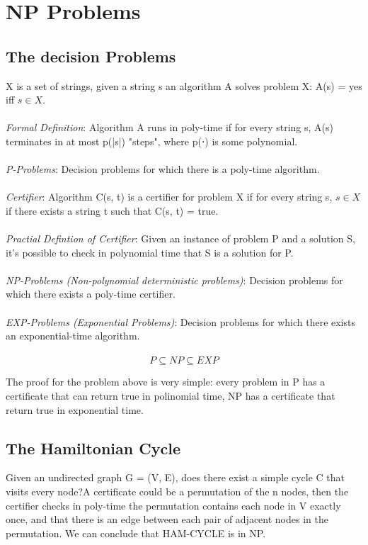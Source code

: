 \section{NP Problems}

\subsection{The decision Problems}
X is a set of strings, given a string s an algorithm A solves problem X: A(s) = yes iff $s \in X$.\\\\
\emph{Formal Definition}: Algorithm A runs in poly-time if for every string s, A(s) terminates in at most p(|s|) "steps", where p(⋅) is some polynomial.\\\\
\emph{P-Problems}:  Decision problems for which there is a poly-time algorithm.\\\\
\emph{Certifier}: Algorithm C(s, t) is a certifier for problem X if for every string s, $s \in X$ if there exists a string t such that C(s, t) = true.\\\\
\emph{Practial Defintion of Certifier}: Given an instance of problem P and a solution S, it's possible to check in polynomial time that S is a solution for P.\\\\
\emph{NP-Problems (Non-polynomial deterministic problems)}: Decision problems for which there exists a poly-time certifier.\\\\
\emph{EXP-Problems (Exponential Problems)}: Decision problems for which there exists an exponential-time algorithm.\\\\

\[P \subseteq NP \subseteq EXP\]

The proof for the problem above is very simple: every problem in P has a certificate that can return true in polinomial time, NP has a certificate that return true in exponential time.

\subsection{The Hamiltonian Cycle}
Given an undirected graph G = (V, E), does there exist a simple cycle C that visits every node?A certificate could be a permutation of the n nodes, then the certifier checks in poly-time the permutation contains each node in V exactly once, and that there is an edge between each pair of adjacent nodes in the permutation. We can conclude that HAM-CYCLE is in NP.

